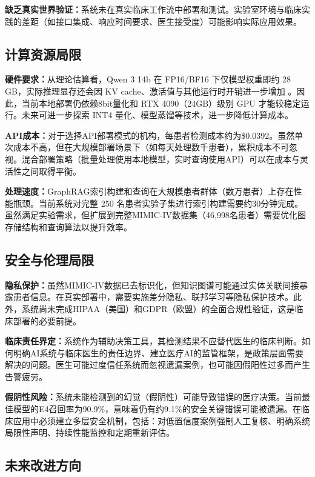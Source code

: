 \documentclass[11pt]{article}
\begin{document}
\textbf{缺乏真实世界验证：}系统未在真实临床工作流中部署和测试。实验室环境与临床实践的差距（如接口集成、响应时间要求、医生接受度）可能影响实际应用效果。

\subsection{计算资源局限}

\textbf{硬件要求：}从理论估算看，Qwen 3 14b 在 FP16/BF16 下仅模型权重即约 28 GB，实际推理显存还会因 KV cache、激活值与其他运行时开销进一步增加 \citep{yang2025qwen3TechnicalReport,micikevicius2018mixedPrecision,fujii2024memoryConsumptionEstimator,kim2024llmem}。因此，当前本地部署仍依赖8bit量化和 RTX 4090（24GB）级别 GPU 才能较稳定运行。未来可进一步探索 INT4 量化、模型蒸馏等技术，进一步降低计算成本。

\textbf{API成本：}对于选择API部署模式的机构，每患者检测成本约为\$0.0392。虽然单次成本不高，但在大规模部署场景下（如每天处理数千患者），累积成本不可忽视。混合部署策略（批量处理使用本地模型，实时查询使用API）可以在成本与灵活性之间取得平衡。

\textbf{处理速度：}GraphRAG索引构建和查询在大规模患者群体（数万患者）上存在性能瓶颈。当前系统对完整 250 名患者实验子集进行索引构建需要约30分钟完成。虽然满足实验需求，但扩展到完整MIMIC-IV数据集（46,998名患者）需要优化图存储结构和查询算法以提升效率。

\subsection{安全与伦理局限}

\textbf{隐私保护：}虽然MIMIC-IV数据已去标识化，但知识图谱可能通过实体关联间接暴露患者信息。在真实部署中，需要实施差分隐私、联邦学习等隐私保护技术。此外，系统尚未完成HIPAA（美国）和GDPR（欧盟）的全面合规性验证，这是临床部署的必要前提。

\textbf{临床责任界定：}系统作为辅助决策工具，其检测结果不应替代医生的临床判断。如何明确AI系统与临床医生的责任边界、建立医疗AI的监管框架，是政策层面需要解决的问题。医生可能过度信任系统而忽视遗漏案例，也可能因假阳性过多而产生告警疲劳。

\textbf{假阴性风险：}系统未能检测到的幻觉（假阴性）可能导致错误的医疗决策。当前最佳模型的E4召回率为90.9\%，意味着仍有约9.1\%的安全关键错误可能被遗漏。在临床应用中必须建立多层安全机制，包括：对低置信度案例强制人工复核、明确系统局限性声明、持续性能监控和定期重新评估。

\subsection{未来改进方向}
\end{document}

